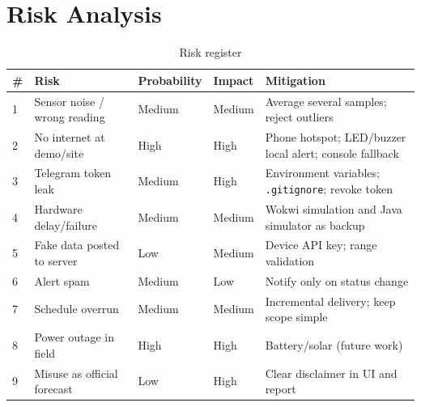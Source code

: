 \documentclass[12pt,a4paper]{article}
\begin{document}
\section{Risk Analysis}
\begin{table}[H]\centering\small
\begin{tabular}{@{}p{0.3cm}p{4.3cm}p{1.8cm}p{1.6cm}p{5.6cm}@{}}
\toprule \# & \textbf{Risk} & \textbf{Probability} & \textbf{Impact} & \textbf{Mitigation}\\\midrule
1 & Sensor noise / wrong reading & Medium & Medium & Average several samples; reject outliers\\
2 & No internet at demo/site & High & High & Phone hotspot; LED/buzzer local alert; console fallback\\
3 & Telegram token leak & Medium & High & Environment variables; \texttt{.gitignore}; revoke token\\
4 & Hardware delay/failure & Medium & Medium & Wokwi simulation and Java simulator as backup\\
5 & Fake data posted to server & Low & Medium & Device API key; range validation\\
6 & Alert spam & Medium & Low & Notify only on status change\\
7 & Schedule overrun & Medium & Medium & Incremental delivery; keep scope simple\\
8 & Power outage in field & High & High & Battery/solar (future work)\\
9 & Misuse as official forecast & Low & High & Clear disclaimer in UI and report\\\bottomrule
\end{tabular}
\caption{Risk register}
\end{table}

\end{document}
